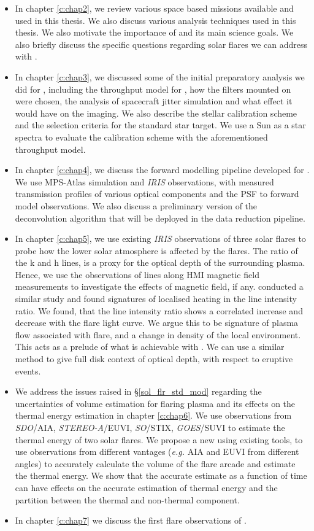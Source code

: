 \begin{itemize}
    \item In chapter \ref{c:chap2}, we review various space based missions available and used in this thesis. We also discuss various analysis techniques used in this thesis. We also motivate the importance of {\suit} and its main science goals. We also briefly discuss the specific questions regarding solar flares we can address with {\suit}.
    \item In chapter \ref{c:chap3}, we discussed some of the initial preparatory analysis we did for {\suit}, including the throughput model for {\suit}, how the filters mounted on {\suit} were chosen, the analysis of spacecraft jitter simulation and what effect it would have on the imaging. We also describe the stellar calibration scheme and the selection criteria for the standard star target. We use a Sun as a star spectra to evaluate the calibration scheme with the aforementioned throughput model.
    \item In chapter \ref{c:chap4}, we discuss the forward modelling pipeline developed for {\suit}. We use MPS-Atlas simulation and {\it IRIS} observations, with measured transmission profiles of various optical components and the PSF to forward model {\suit} observations. We also discuss a preliminary version of the deconvolution algorithm that will be deployed in the data reduction pipeline.
    \item In chapter \ref{c:chap5}, we use existing {\it IRIS} observations of three solar flares to probe how the lower solar atmosphere is affected by the flares. The ratio of the  k and h lines, is a proxy for the optical depth of the surrounding plasma. Hence, we use the observations of  lines along HMI magnetic field measurements to investigate the effects of magnetic field, if any. \cite{kerr15} conducted a similar study and found signatures of localised heating in the line intensity ratio. We found, that the line intensity ratio shows a correlated increase and decrease with the flare light curve. We argue this to be signature of plasma flow associated with flare, and a change in density of the local environment. This acts as a prelude of what is achievable with {\suit}. We can use a similar method to give full disk context of optical depth, with respect to eruptive events.
    \item We address the issues raised in \S\ref{sol_flr_std_mod} regarding the uncertainties of volume estimation for flaring plasma and its effects on the thermal energy estimation in chapter \ref{c:chap6}. We use observations from {\it SDO}/AIA, {\it STEREO-A}/EUVI, {\it SO}/STIX, {\it GOES}/SUVI to estimate the thermal energy of two solar flares. We propose a new  using existing tools, to use observations from different vantages ({\it e.g.} AIA and EUVI from different angles) to accurately calculate the volume of the flare arcade and estimate the thermal energy. We show that the accurate estimate as a function of time can have effects on the accurate estimation of thermal energy and the partition between the thermal and non-thermal component.
    \item In chapter \ref{c:chap7} we discuss the first flare observations of {\suit}. 
\end{itemize}
